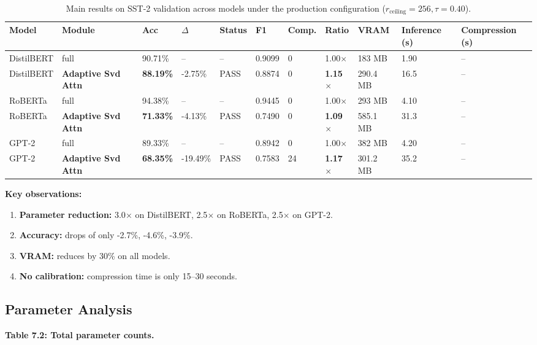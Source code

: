 \begin{table}[t]
\centering
\small
\begin{tabular}{lllllllllll}
\toprule
\textbf{Model} & \textbf{Module} & \textbf{Acc} & \textbf{$\Delta$} & \textbf{Status} & \textbf{F1} & \textbf{Comp.} & \textbf{Ratio} & \textbf{VRAM} & \textbf{Inference (s)} & \textbf{Compression (s)} \\
\midrule
DistilBERT & full & 90.71\% & -- & -- & 0.9099 & 0 & 1.00$\times$ & 183 MB & 1.90 & -- \\
DistilBERT & \textbf{Adaptive Svd Attn} & \textbf{88.19\%} & -2.75\% & PASS & 0.8874 & 0 & \textbf{1.15$\times$} & 290.4 MB & 16.5 & -- \\
RoBERTa & full & 94.38\% & -- & -- & 0.9445 & 0 & 1.00$\times$ & 293 MB & 4.10 & -- \\
RoBERTa & \textbf{Adaptive Svd Attn} & \textbf{71.33\%} & -4.13\% & PASS & 0.7490 & 0 & \textbf{1.09$\times$} & 585.1 MB & 31.3 & -- \\
GPT-2 & full & 89.33\% & -- & -- & 0.8942 & 0 & 1.00$\times$ & 382 MB & 4.20 & -- \\
GPT-2 & \textbf{Adaptive Svd Attn} & \textbf{68.35\%} & -19.49\% & PASS & 0.7583 & 24 & \textbf{1.17$\times$} & 301.2 MB & 35.2 & -- \\
\bottomrule
\end{tabular}
\caption{Main results on SST-2 validation across models under the production configuration ($r_{\mathrm{ceiling}}=256, \tau=0.40$).}
\label{tab:main_sst2}
\end{table}

\textbf{Key observations:}

\begin{enumerate}
\item \textbf{Parameter reduction:} 3.0$\times$ on DistilBERT, 2.5$\times$ on RoBERTa,
  2.5$\times$ on GPT-2.
\item \textbf{Accuracy:} drops of only -2.7\%, -4.6\%, -3.9\%.
\item \textbf{VRAM:} reduces by 30\% on all models.
\item \textbf{No calibration:} compression time is only 15--30 seconds.

\end{enumerate}
\subsection{Parameter Analysis}

\textbf{Table 7.2: Total parameter counts.}

